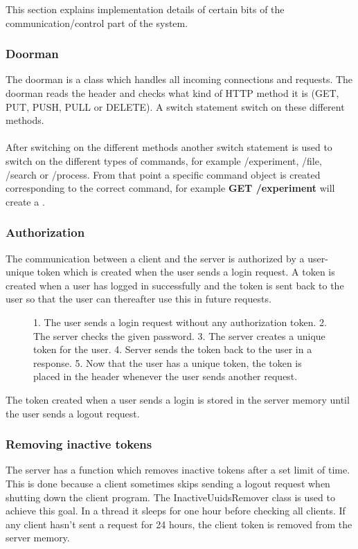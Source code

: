 This section explains implementation details of certain bits of the communication/control part of the system.
\subsubsection{Doorman}
The doorman is a class which handles all incoming connections and requests. The doorman reads the header and checks what kind of HTTP method it is (GET, PUT, PUSH, PULL or DELETE). A switch statement switch on these different methods.\\
\\
After switching on the different methods another switch statement is used to switch on the different types of commands, for example /experiment, /file, /search or /process. From that point a specific command object is created corresponding to the correct command, for example \textbf{GET /experiment} will create a .
\subsubsection{Authorization}
The communication between a client and the server is authorized by a user-unique token which is created when the user sends a login request. A token is created when a user has logged in successfully and the token is sent back to the user so that the user can thereafter use this in future requests. 
\begin{figure}[h]
\caption{1. The user sends a login request without any authorization token. 2. The server checks the given password. 3. The server creates a unique token for the user. 4. Server sends the token back to the user in a response. 5. Now that the user has a unique token, the token is placed in the header whenever the user sends another request.}
\label{fig:com_authorization}
\end{figure}
The token created when a user sends a login is stored in the server memory until the user sends a logout request.
\subsubsection{Removing inactive tokens}
The server has a function which removes inactive tokens after a set limit of time. This is done because a client sometimes skips sending a logout request when shutting down the client program. The InactiveUuidsRemover class is used to achieve this goal. In a thread it sleeps for one hour before checking all clients. If any client hasn't sent a request for 24 hours, the client token is removed from the server memory.
